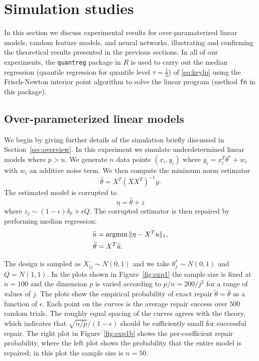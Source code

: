 
\section{Simulation studies}
\label{sec:experiments}

In this section we discuss experimental results for over-paramaterized linear models, random feature models, and neural networks, illustrating and confirming the theoretical results presented in the previous sections.
In all of our experiments, the \texttt{quantreg} package in $R$ is used to carry out the median regression (quantile regression for quantile level $\tau = \frac{1}{2}$) of \eqref{eq:keylp} using the Frisch-Newton interior point algorithm to solve the linear program (method \texttt{fn} in this package).


\subsection{Over-parameterized linear models}


We begin by giving further details of the simulation briefly discussed
in Section~\ref{sec:overview}. In this experiment we simulate underdetermined linear models where $p > n$.
We generate $n$ data points $(x_i, y_i)$ where
$y_i = x_i^T \theta^* + w_i$ with $w_i$ an additive noise term. We then compute the minimum norm estimator
\begin{equation}
  \hat\theta = X^T (X X^T)^{-1} y.
\end{equation}
The estimated model is corrupted to
\begin{equation}
  \eta = \hat\theta + z
\end{equation}
where $z_j \sim (1-\epsilon) \delta_0 +\epsilon Q$. The corrupted estimator is then repaired by performing median regression:
\begin{align}
  \tilde u &= \argmin \|\eta - X^T u\|_1, \\
  \tilde \theta &= X^T \tilde u.
\end{align}

The design is sampled as $X_{ij} \sim N(0,1)$ and we take $\theta_j^* \sim N(0,1)$ and $Q = N(1,1)$. In the plots shown
in Figure~\ref{fig:exp1} the sample size is fixed at $n=100$ and the dimension $p$ is varied according to $p/n=200/j^2$
for a range of values of $j$. The plots show the empirical probability of exact repair $\tilde\theta = \hat\theta$ as a function of $\epsilon$. Each point on the curves is the average repair success over $500$ random trials.
The roughly equal spacing of the curves agrees with the theory, which indicates that $\sqrt{n/p}/(1-\epsilon)$ should be sufficiently small for successful repair. The right plot in Figure~\ref{fig:exp1b} shows the per-coefficient repair probability, where the left plot shows the probability that the entire model is repaired; in this plot the sample size is $n=50$.


